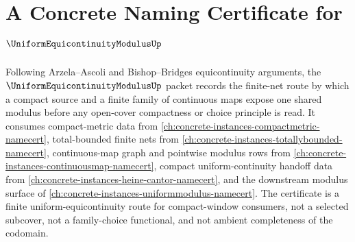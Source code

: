 \chapter{A Concrete Naming Certificate for $\UniformEquicontinuityModulusUp$}
\label{ch:concrete-instances-uniform-equicontinuity-modulus-namecert}

Following Arzela--Ascoli and Bishop--Bridges equicontinuity arguments, the $\UniformEquicontinuityModulusUp$ packet records the finite-net route by which a compact source and a finite family of continuous maps expose one shared modulus before any open-cover compactness or choice principle is read. It consumes compact-metric data from \autoref{ch:concrete-instances-compactmetric-namecert}, total-bounded finite nets from \autoref{ch:concrete-instances-totallybounded-namecert}, continuous-map graph and pointwise modulus rows from \autoref{ch:concrete-instances-continuousmap-namecert}, compact uniform-continuity handoff data from \autoref{ch:concrete-instances-heine-cantor-namecert}, and the downstream modulus surface of \autoref{ch:concrete-instances-uniformmodulus-namecert}. The certificate is a finite uniform-equicontinuity route for compact-window consumers, not a selected subcover, not a family-choice functional, and not ambient completeness of the codomain.

